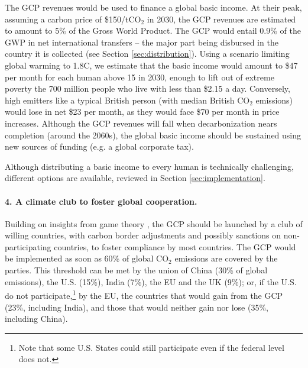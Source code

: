 \documentclass[12pt,english]{article}
\begin{document}
The GCP revenues would be used to finance a global basic income. At their peak, assuming a carbon price of \$150/tCO$_\text{2}$ in 2030, the GCP revenues are estimated to amount to 5\% of the Gross World Product. The GCP would entail 0.9\% of the GWP in net international transfers -- the major part being disbursed in the country it is collected (see Section \ref{sec:distribution}). %
Using a scenario limiting global warming to 1.8\textdegree{}C,%
we estimate that the basic income would amount to \$47 per month for each human above 15 in 2030, enough to lift out of extreme poverty the 700 million people who live with less than \$2.15 a day. %
Conversely, high emitters like a typical British person (with median British CO$_\text{2}$ emissions) would lose in net \$23 per month, as they would face \$70 per month in price increases. %
Although the GCP revenues will fall when decarbonization nears completion (around the 2060s), the global basic income should be sustained using new sources of funding (e.g. a global corporate tax). 

Although distributing a basic income to every human is technically challenging, different options are available, reviewed in Section \ref{sec:implementation}. 

\paragraph*{4. A climate club to foster global cooperation.}

Building on insights from game theory \citep{mackay_price_2015, nordhaus_climate_2015}, the GCP should be launched by a club of willing countries, with carbon border adjustments and possibly sanctions on non-participating countries, to foster compliance by most countries. 
The GCP would be implemented as soon as 60\% of global CO$_\text{2}$ emissions are covered by the parties. This threshold can be met by the union of China (30\% of global emissions), the U.S. (15\%), India (7\%), the EU and the UK (9\%); or, if the U.S. do not participate,\footnote{Note that some U.S. States could still participate even if the federal level does not.} by the EU, the countries that would gain from the GCP (23\%, including India), and those that would neither gain nor lose (35\%, including China).
\end{document}
